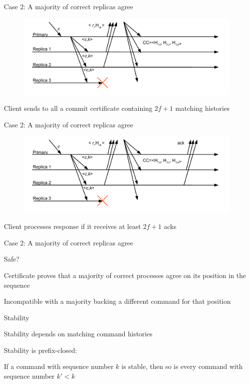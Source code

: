 \begin{frame}{Case 2: A majority of correct replicas agree}

\begin{figure}
	\includegraphics[width=\textwidth]{figs/17/messages9}	
\end{figure}

Client sends to all a \alert{commit certificate} containing $2f+1$ matching histories

\end{frame}

\begin{frame}{Case 2: A majority of correct replicas agree}

\begin{figure}
	\includegraphics[width=\textwidth]{figs/17/messages10}	
\end{figure}

Client processes response if it receives at least $2f +1$ acks

\end{frame}

\begin{frame}{Case 2: A majority of correct replicas agree}
	
Safe?
\BIL
\item Certificate proves that a majority of correct processes agree on its position in the sequence
\item Incompatible with a majority backing a different command for that position
\EIL

\bigskip
Stability
\BIL
\item Stability depends on matching command histories 
\item Stability is \alert{prefix-closed}:
	\BI
	\item If a command with sequence number $k$ is stable, then so is every command with sequence number $k' < k$
	\EI
\EIL
\end{frame}

